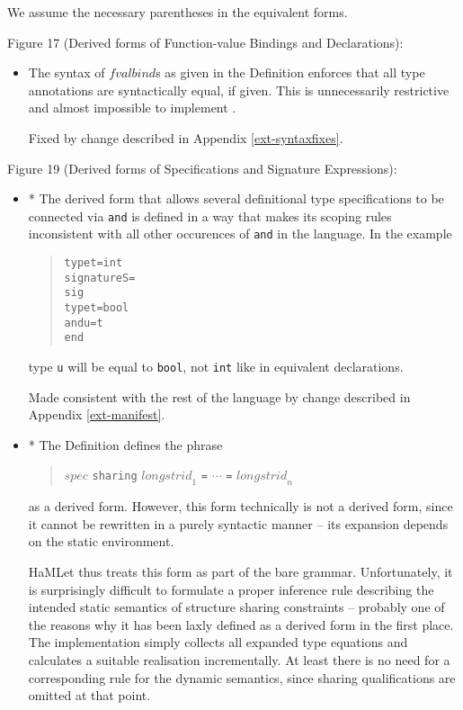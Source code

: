 \documentclass[twoside,titlepage]{article}
\begin{document}
\begin{appendix}
\begin{itemize}
We assume the necessary parentheses in the equivalent forms.
\end{itemize}


Figure 17 (Derived forms of Function-value Bindings and Declarations):

\begin{itemize}
\item The syntax of $\mathit{fvalbind}$s as given in the Definition enforces that all type annotations are syntactically equal, if given. This is unnecessarily restrictive and almost impossible to implement \cite{mistakes}.

Fixed by change described in Appendix \ref{ext-syntaxfixes}.
\end{itemize}


Figure 19 (Derived forms of Specifications and Signature Expressions):

\begin{itemize}
\item * The derived form that allows several definitional type specifications to be connected via {\tt and} is defined in a way that makes its scoping rules inconsistent with all other occurences of {\tt and} in the language. In the example

\begin{quote}
\begin{alltt}
type t = int
signature S =
sig
    type t = bool
    and  u = t
end
\end{alltt}
\end{quote}

type {\tt u} will be equal to {\tt bool}, not {\tt int} like in equivalent declarations.

Made consistent with the rest of the language by change described in Appendix \ref{ext-manifest}.

\item * The Definition defines the phrase

\begin{quote}
$\mathit{spec}$ {\tt sharing} $\mathit{longstrid}_1$ {\tt =} $\cdots$ {\tt =} $\mathit{longstrid}_n$
\end{quote}

as a derived form. However, this form technically is not a derived form, since it cannot be rewritten in a purely syntactic manner -- its expansion depends on the static environment.

HaMLet thus treats this form as part of the bare grammar. Unfortunately, it is surprisingly difficult to formulate a proper inference rule describing the intended static semantics of structure sharing constraints -- probably one of the reasons why it has been laxly defined as a derived form in the first place. The implementation simply collects all expanded type equations and calculates a suitable realisation incrementally. At least there is no need for a corresponding rule for the dynamic semantics, since sharing qualifications are omitted at that point.


\end{itemize}
\end{appendix}
\end{document}
